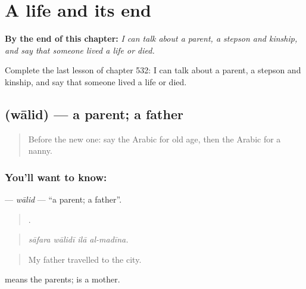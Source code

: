 
\chapter{A life and its end}
\label{ch:ar-a-life-and-its-end}

\begin{chapteropening}
\textbf{By the end of this chapter:} \emph{I can talk about a parent, a stepson and kinship, and say that someone lived a life or died.}

Complete the last lesson of chapter 532: I can talk about a parent, a stepson and kinship, and say that someone lived a life or died.
\end{chapteropening}

\section[\texorpdfstring{\ar{والد} (wālid)}{والد (wālid)}]{ (wālid) — a parent; a father}

\label{lesson:AR-C532-walid}



\begin{quote}
Before the new one: say the Arabic for old age, then the Arabic for a nanny.
\end{quote}

\subsection*{You'll want to know: }
\textbf{} — \emph{wālid} — \textquotedblleft{}a parent; a father\textquotedblright{}.

\begin{quote}
   .
\end{quote}

\begin{quote}
\emph{sāfara wālidī ilā al-madīna.}
\end{quote}

\begin{quote}
My father travelled to the city.
\end{quote}

 means the parents;  is a mother.

